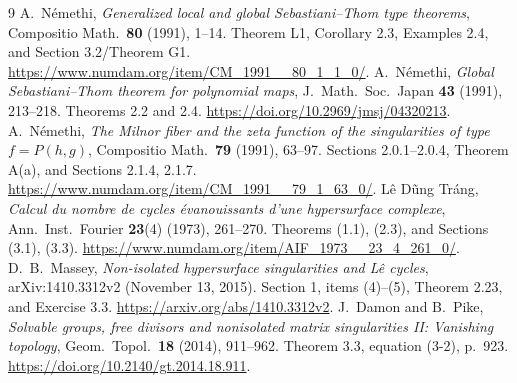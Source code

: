 \documentclass[11pt]{article}
\begin{document}
\begin{thebibliography}{9}
A.~N\'emethi, \emph{Generalized local and global
Sebastiani--Thom type theorems}, Compositio Math.\ \textbf{80}
(1991), 1--14.  Theorem L1, Corollary 2.3, Examples 2.4,
and Section 3.2/Theorem G1.
\url{https://www.numdam.org/item/CM_1991__80_1_1_0/}.
A.~N\'emethi, \emph{Global Sebastiani--Thom theorem for polynomial
maps}, J.\ Math.\ Soc.\ Japan \textbf{43} (1991), 213--218.
Theorems 2.2 and 2.4.
\url{https://doi.org/10.2969/jmsj/04320213}.
A.~N\'emethi, \emph{The Milnor fiber and the zeta function of the
singularities of type \(f=P(h,g)\)}, Compositio Math.\ \textbf{79}
(1991), 63--97.  Sections 2.0.1--2.0.4, Theorem A(a), and
Sections 2.1.4, 2.1.7.
\url{https://www.numdam.org/item/CM_1991__79_1_63_0/}.
L\^e D\~ung Tr\'ang, \emph{Calcul du nombre de cycles
\'evanouissants d'une hypersurface complexe},
Ann.\ Inst.\ Fourier \textbf{23}(4) (1973), 261--270.
Theorems (1.1), (2.3), and Sections (3.1), (3.3).
\url{https://www.numdam.org/item/AIF_1973__23_4_261_0/}.
D.~B.~Massey, \emph{Non-isolated hypersurface singularities
and L\^e cycles}, arXiv:1410.3312v2 (November 13, 2015).
Section 1, items (4)--(5), Theorem 2.23, and Exercise 3.3.
\url{https://arxiv.org/abs/1410.3312v2}.
J.~Damon and B.~Pike, \emph{Solvable groups, free divisors and
nonisolated matrix singularities II: Vanishing topology},
Geom.\ Topol.\ \textbf{18} (2014), 911--962.
Theorem 3.3, equation (3-2), p.~923.
\url{https://doi.org/10.2140/gt.2014.18.911}.
\end{thebibliography}
\end{document}
